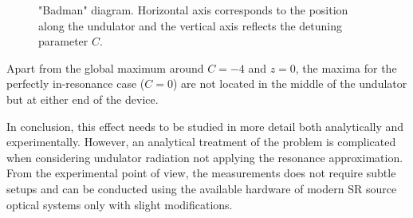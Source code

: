 \begin{figure}[h!]
\begin{minipage}[b]{0.48\linewidth}
            \captionsetup{justification=centering}
            \caption{}
            \label{fig:badman_Nw_10}
        \end{minipage}
        \caption{"Badman" diagram. Horizontal axis corresponds to the position along the undulator and the vertical axis reflects the detuning parameter $C$.}
    \end{figure}
    Apart from the global maximum around $C = -4$ and $z = 0$, the maxima for the perfectly in-resonance case ($C = 0$) are not located in the middle of the undulator but at either end of the device.

    In conclusion, this effect needs to be studied in more detail both analytically and experimentally. However, an analytical treatment of the problem is complicated when considering undulator radiation not applying the resonance approximation. From the experimental point of view, the measurements does not require subtle setups and can be conducted using the available hardware of modern SR source optical systems only with slight modifications.